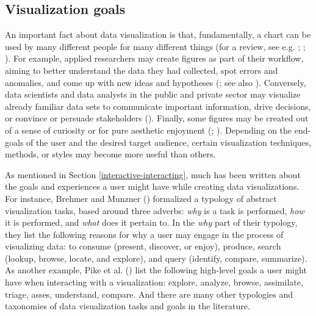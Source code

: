 \documentclass[
]{book}
\begin{document}
\subsection{Visualization goals}\label{visualization-goals}

An important fact about data visualization is that, fundamentally, a chart can be used by many different people for many different things (for a review, see e.g. ; ; ). For example, applied researchers may create figures as part of their workflow, aiming to better understand the data they had collected, spot errors and anomalies, and come up with new ideas and hypotheses (; see also ). Conversely, data scientists and data analysts in the public and private sector may visualize already familiar data sets to communicate important information, drive decisions, or convince or persuade stakeholders (). Finally, some figures may be created out of a sense of curiosity or for pure aesthetic enjoyment (; ). Depending on the end-goals of the user and the desired target audience, certain visualization techniques, methods, or styles may become more useful than others.

As mentioned in Section \ref{interactive-interacting}, much has been written about the goals and experiences a user might have while creating data visualizations. For instance, Brehmer and Munzner () formalized a typology of abstract visualization tasks, based around three adverbs: \emph{why} is a task is performed, \emph{how} it is performed, and \emph{what} does it pertain to. In the \emph{why} part of their typology, they list the following reasons for why a user may engage in the process of visualizing data: to consume (present, discover, or enjoy), produce, search (lookup, browse, locate, and explore), and query (identify, compare, summarize). As another example, Pike et al. () list the following high-level goals a user might have when interacting with a visualization: explore, analyze, browse, assimilate, triage, asses, understand, compare. And there are many other typologies and taxonomies of data visualization tasks and goals in the literature.
\end{document}
